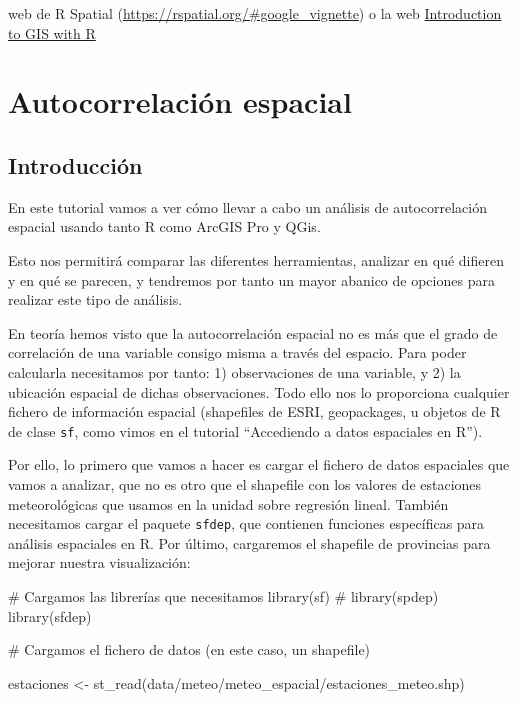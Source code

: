 \documentclass[
  letterpaper,
  DIV=11,
  numbers=noendperiod]{scrreprt}
\newenvironment{Shaded}{\begin{snugshade}}{\end{snugshade}}
\newcommand{\CommentTok}[1]{\textcolor[rgb]{0.37,0.37,0.37}{#1}}
\newcommand{\FunctionTok}[1]{\textcolor[rgb]{0.28,0.35,0.67}{#1}}
\newcommand{\NormalTok}[1]{\textcolor[rgb]{0.00,0.23,0.31}{#1}}
\newcommand{\OtherTok}[1]{\textcolor[rgb]{0.00,0.23,0.31}{#1}}
\newcommand{\StringTok}[1]{\textcolor[rgb]{0.13,0.47,0.30}{#1}}
\begin{document}
web de R Spatial (\url{https://rspatial.org/\#google_vignette}) o la web
\href{https://www.jessesadler.com/post/gis-with-r-intro/}{Introduction
to GIS with R}

\hypertarget{sec-Autocorrelacion}{%
\chapter{Autocorrelación espacial}\label{sec-Autocorrelacion}}

\hypertarget{introducciuxf3n-1}{%
\section{Introducción}\label{introducciuxf3n-1}}

En este tutorial vamos a ver cómo llevar a cabo un análisis de
autocorrelación espacial usando tanto R como ArcGIS Pro y QGis.

Esto nos permitirá comparar las diferentes herramientas, analizar en qué
difieren y en qué se parecen, y tendremos por tanto un mayor abanico de
opciones para realizar este tipo de análisis.

En teoría hemos visto que la autocorrelación espacial no es más que el
grado de correlación de una variable consigo misma a través del espacio.
Para poder calcularla necesitamos por tanto: 1) observaciones de una
variable, y 2) la ubicación espacial de dichas observaciones. Todo ello
nos lo proporciona cualquier fichero de información espacial (shapefiles
de ESRI, geopackages, u objetos de R de clase \texttt{sf}, como vimos en
el tutorial ``Accediendo a datos espaciales en R'').

Por ello, lo primero que vamos a hacer es cargar el fichero de datos
espaciales que vamos a analizar, que no es otro que el shapefile con los
valores de estaciones meteorológicas que usamos en la unidad sobre
regresión lineal. También necesitamos cargar el paquete \texttt{sfdep},
que contienen funciones específicas para análisis espaciales en R. Por
último, cargaremos el shapefile de provincias para mejorar nuestra
visualización:

\begin{Shaded}
\begin{Highlighting}[]
\CommentTok{\# Cargamos las librerías que necesitamos}
\FunctionTok{library}\NormalTok{(sf)}
\CommentTok{\# library(spdep)}
\FunctionTok{library}\NormalTok{(sfdep) }

\CommentTok{\# Cargamos el fichero de datos (en este caso, un shapefile)}

\NormalTok{estaciones }\OtherTok{\textless{}{-}} \FunctionTok{st\_read}\NormalTok{(}\StringTok{\textquotesingle{}data/meteo/meteo\_espacial/estaciones\_meteo.shp\textquotesingle{}}\NormalTok{)}
\end{Highlighting}
\end{Shaded}
\end{document}
